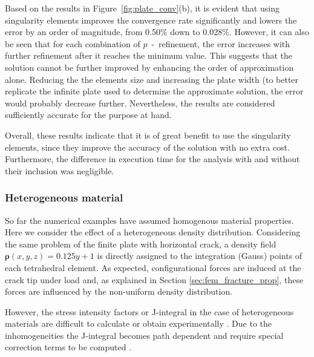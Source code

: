 \documentclass[onecolumn]{svjour3}
\begin{document}
Based on the results in Figure~\ref{fig:plate_conv}(b), it is evident that using singularity elements improves the convergence rate significantly and lowers the error by an order of magnitude, from 0.50\% down to 0.028\%. 
However, it can also be seen that for each combination of $p$~-~refinement, the error increases with further refinement after it reaches the minimum value. 
This suggests that the solution cannot be further improved by enhancing the order of approximation alone. 
Reducing the the elements size and increasing the plate width (to better replicate the infinite plate used to determine the approximate solution, the error would probably decrease further. 
Nevertheless, the results are considered sufficiently accurate for the purpose at hand. 

Overall, these results indicate that it is of great benefit to use the singularity elements, since they improve the accuracy of the solution with no extra cost.
Furthermore, the difference in execution time for the analysis with and without their inclusion was negligible. 

\subsubsection{Heterogeneous material}

So far the numerical examples have assumed homogenous material properties. Here we consider the effect of a heterogeneous density distribution. 
Considering the same problem of the finite plate with horizontal crack, a density field $\mathbf{\rho}(x,y,z) = 0.125y + 1$ is directly assigned to the integration (Gauss) points of each tetrahedral element.
As expected, configurational forces are induced at the crack tip under load and, as explained in Section \ref{sec:fem_fracture_prop}, these forces are influenced by the non-uniform density distribution. 

However, the stress intensity factors or J-integral in the case of heterogeneous materials are difficult to calculate or obtain experimentally \citep{fischer_problems_2014}. Due to the inhomogeneities the J-integral becomes path dependent and require special correction terms to be computed \citep{eischen_fracture_1987, chang_extension_2002}. 
\end{document}
